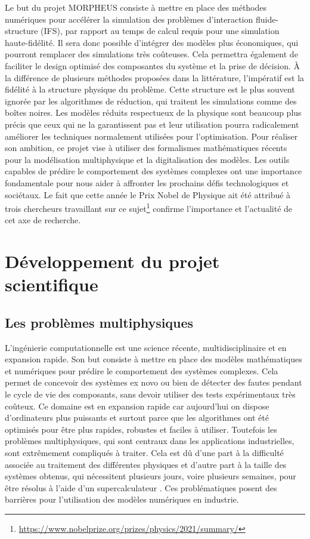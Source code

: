 \documentclass[12pt, french]{article}
\begin{document}
	Le but du projet MORPHEUS consiste à mettre en place des méthodes numériques
	pour accélérer la simulation des problèmes d'interaction fluide-structure (IFS), par rapport au temps de calcul requis pour une simulation haute-fidélité. Il sera donc possible d'intégrer des modèles plus économiques, qui pourront remplacer des simulations très coûteuses. Cela permettra également de faciliter le design optimisé des composantes du système et la prise de décision. À la différence de plusieurs méthodes proposées dans la littérature, l'impératif est la fidélité à la structure physique du problème.  Cette structure est le plus souvent ignorée par les algorithmes de réduction, qui traitent les simulations comme des boîtes noires. Les modèles réduits respectueux de la physique sont beaucoup plus précis que ceux qui ne la garantissent pas et leur utilisation pourra radicalement améliorer les techniques normalement utilisées pour l'optimisation. Pour réaliser son ambition, ce projet vise à utiliser des formalismes mathématiques récents pour la modélisation multiphysique et la digitalisation des modèles. Les outils capables de prédire le comportement des systèmes complexes ont une importance fondamentale pour nous aider à affronter les prochains défis technologiques et sociétaux. Le fait que cette année le Prix Nobel de Physique ait été attribué à trois chercheurs travaillant sur ce sujet\footnote{\url{https://www.nobelprize.org/prizes/physics/2021/summary/}} confirme
	l'importance et l'actualité de cet axe de recherche.
	
	
	\section{Développement du projet scientifique}
	
	\subsection{Les problèmes multiphysiques}
	L'ingénierie computationnelle est une science récente, multidisciplinaire et en expansion rapide. Son but consiste à mettre en place des modèles mathématiques et numériques pour prédire le comportement des systèmes complexes. Cela permet de concevoir des systèmes ex novo ou bien de détecter des fautes pendant le cycle de vie des composants, sans devoir utiliser des tests expérimentaux très co\^{u}teux. Ce domaine est en expansion rapide car aujourd'hui on dispose d'ordinateurs plus puissants et surtout parce que les algorithmes ont été optimisés pour être plus rapides, robustes et faciles à utiliser. Toutefois les problèmes multiphysiques, qui sont centraux dans les applications industrielles, sont extrêmement compliqués à traiter. Cela est d\^u d'une part à la difficulté associée au traitement des différentes physiques et d'autre part à la taille des systèmes obtenus, qui nécessitent plusieurs jours, voire plusieurs semaines, pour être résolus à l'aide d'un supercalculateur \cite{keyes2013}. Ces problématiques posent des barrières pour l'utilisation des modèles numériques en industrie. 
	
\end{document}
